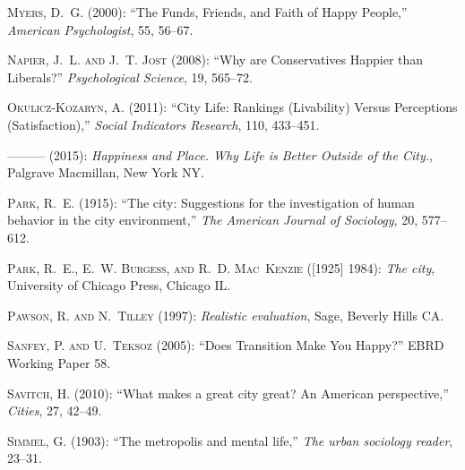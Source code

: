 \documentclass[12pt, letterpaper]{article}
\begin{document}
\begin{spacing}{1.9}
\begin{thebibliography}{77}
\textsc{Myers, D.~G.} (2000): \enquote{The Funds, Friends, and Faith of Happy
  People,} \emph{American Psychologist}, 55, 56--67.

\textsc{Napier, J.~L. and J.~T. Jost} (2008): \enquote{{Why are Conservatives
  Happier than Liberals?}} \emph{Psychological Science}, 19, 565--72.

\textsc{Okulicz-Kozaryn, A.} (2011): \enquote{City Life: Rankings (Livability)
  Versus Perceptions (Satisfaction),} \emph{Social Indicators Research}, 110,
  433--451.

---\hspace{-.1pt}---\hspace{-.1pt}--- (2015): \emph{Happiness and Place. Why
  Life is Better Outside of the City.}, Palgrave Macmillan, New York NY.

\textsc{Park, R.~E.} (1915): \enquote{The city: Suggestions for the
  investigation of human behavior in the city environment,} \emph{The American
  Journal of Sociology}, 20, 577--612.

\textsc{Park, R.~E., E.~W. Burgess, and R.~D. Mac~Kenzie} ([1925] 1984):
  \emph{The city}, University of Chicago Press, Chicago IL.

\textsc{Pawson, R. and N.~Tilley} (1997): \emph{Realistic evaluation}, Sage,
  Beverly Hills CA.

\textsc{Sanfey, P. and U.~Teksoz} (2005): \enquote{Does Transition Make You
  Happy?} EBRD Working Paper 58.

\textsc{Savitch, H.} (2010): \enquote{What makes a great city great? An
  American perspective,} \emph{Cities}, 27, 42--49.

\textsc{Simmel, G.} (1903): \enquote{The metropolis and mental life,} \emph{The
  urban sociology reader}, 23--31.


\end{thebibliography}
\end{spacing}
\end{document}
